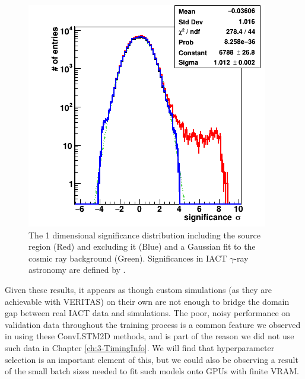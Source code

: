 \begin{figure}[h] 
        \centering \includegraphics[width=\columnwidth]{figures/sig1d.png}

        \caption{
                \label{fig:sig1d} The 1 dimensional significance distribution including the source region (Red) and excluding it (Blue) and a Gaussian fit to the cosmic ray background (Green). Significances in IACT $\gamma$-ray astronomy are defined by \cite{LiMa}.
        }
\end{figure}
Given these results, it appears as though custom simulations (as they are achievable with VERITAS) on their own are not enough to bridge the domain gap between real IACT data and simulations. The poor, noisy performance on validation data throughout the training process is a common feature we observed in using these ConvLSTM2D methods, and is part of the reason we did not use such data in Chapter \ref{ch:3-TimingInfo}. We will find that hyperparameter selection is an important element of this, but we could also be observing a result of the small batch sizes needed to fit such models onto GPUs with finite VRAM.

